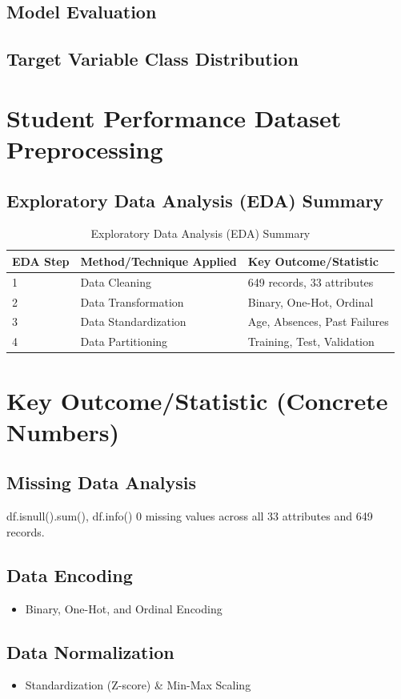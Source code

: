 \documentclass[twocolumn]{svjour3}
\begin{document}
\subsection{Model Evaluation}
\subsection{Target Variable Class Distribution}
\section{Student Performance Dataset Preprocessing}
\subsection{Exploratory Data Analysis (EDA) Summary}
\begin{table}
\centering
\caption{Exploratory Data Analysis (EDA) Summary}
\begin{tabular}{lll}
\hline
EDA Step & Method/Technique Applied & Key Outcome/Statistic \\
\hline
1 & Data Cleaning & 649 records, 33 attributes \\
2 & Data Transformation & Binary, One-Hot, Ordinal \\
3 & Data Standardization & Age, Absences, Past Failures \\
4 & Data Partitioning & Training, Test, Validation \\
\hline
\end{tabular}
\end{table}

\section{Key Outcome/Statistic (Concrete Numbers)}
\subsection{Missing Data Analysis}
df.isnull().sum(), df.info()
0 missing values across all 33 attributes and 649 records.
\subsection{Data Encoding}
\begin{itemize}
\item Binary, One-Hot, and Ordinal Encoding
\end{itemize}
\subsection{Data Normalization}
\begin{itemize}
\item Standardization (Z-score) \& Min-Max Scaling
\end{itemize}
\end{document}

